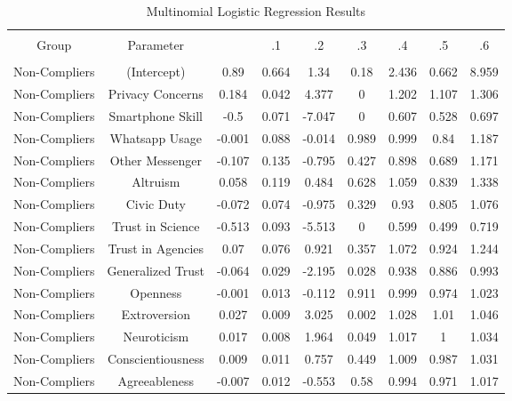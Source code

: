 
\begin{table}[!htbp] \centering 
  \caption{Multinomial Logistic Regression Results} 
  \label{} 
\begin{tabular}{@{\extracolsep{5pt}} ccccccccc} 
\\[-1.8ex]\hline 
\hline \\[-1.8ex] 
Group & Parameter &  & .1 & .2 & .3 & .4 & .5 & .6 \\ 
\hline \\[-1.8ex] 
Non-Compliers & (Intercept) & 0.89 & 0.664 & 1.34 & 0.18 & 2.436 & 0.662 & 8.959 \\ 
Non-Compliers & Privacy Concerns & 0.184 & 0.042 & 4.377 & 0 & 1.202 & 1.107 & 1.306 \\ 
Non-Compliers & Smartphone Skill & -0.5 & 0.071 & -7.047 & 0 & 0.607 & 0.528 & 0.697 \\ 
Non-Compliers & Whatsapp Usage & -0.001 & 0.088 & -0.014 & 0.989 & 0.999 & 0.84 & 1.187 \\ 
Non-Compliers & Other Messenger & -0.107 & 0.135 & -0.795 & 0.427 & 0.898 & 0.689 & 1.171 \\ 
Non-Compliers & Altruism & 0.058 & 0.119 & 0.484 & 0.628 & 1.059 & 0.839 & 1.338 \\ 
Non-Compliers & Civic Duty & -0.072 & 0.074 & -0.975 & 0.329 & 0.93 & 0.805 & 1.076 \\ 
Non-Compliers & Trust in Science & -0.513 & 0.093 & -5.513 & 0 & 0.599 & 0.499 & 0.719 \\ 
Non-Compliers & Trust in Agencies & 0.07 & 0.076 & 0.921 & 0.357 & 1.072 & 0.924 & 1.244 \\ 
Non-Compliers & Generalized Trust & -0.064 & 0.029 & -2.195 & 0.028 & 0.938 & 0.886 & 0.993 \\ 
Non-Compliers & Openness & -0.001 & 0.013 & -0.112 & 0.911 & 0.999 & 0.974 & 1.023 \\ 
Non-Compliers & Extroversion & 0.027 & 0.009 & 3.025 & 0.002 & 1.028 & 1.01 & 1.046 \\ 
Non-Compliers & Neuroticism & 0.017 & 0.008 & 1.964 & 0.049 & 1.017 & 1 & 1.034 \\ 
Non-Compliers & Conscientiousness & 0.009 & 0.011 & 0.757 & 0.449 & 1.009 & 0.987 & 1.031 \\ 
Non-Compliers & Agreeableness & -0.007 & 0.012 & -0.553 & 0.58 & 0.994 & 0.971 & 1.017 \\ 

\end{tabular}
\end{table}
